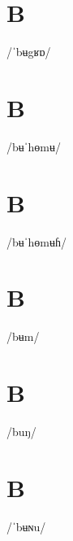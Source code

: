 \documentclass[10pt,a4paper,twoside]{book}
\begin{document}
\section*{B}

\begin{multicols}{3}
 {/ˈbʉgʁɒ/} {}
\end{multicols}

\section*{B}

\begin{multicols}{3}
 {/bʉˈhɵmʉ/} {}
\end{multicols}

\section*{B}

\begin{multicols}{3}
 {/bʉˈhɵmʉɦ/} {}
\end{multicols}

\section*{B}

\begin{multicols}{3}
 {/bʉm/} {}
\end{multicols}

\section*{B}

\begin{multicols}{3}
 {/buŋ/} {}
\end{multicols}

\section*{B}

\begin{multicols}{3}
 {/ˈbʉɴu/} {}
\end{multicols}
\end{document}
